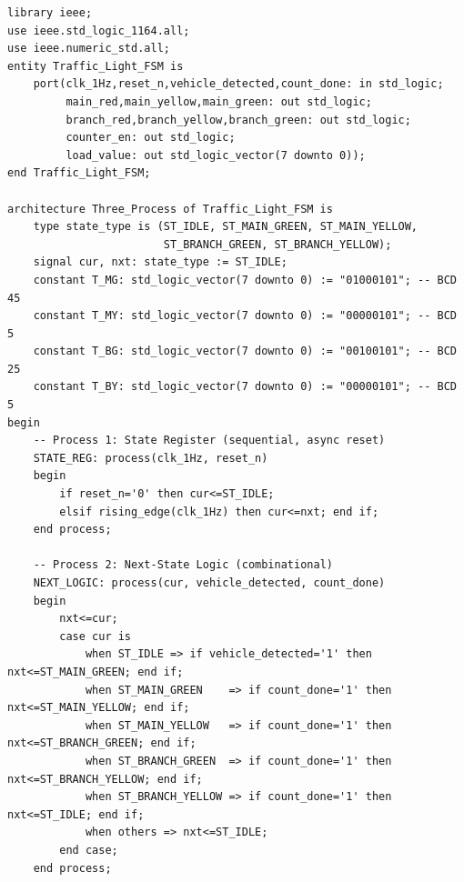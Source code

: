 \documentclass[12pt,a4paper]{ctexart}
\begin{document}
\begin{lstlisting}[caption={Traffic\_Light\_FSM.vhd}]
library ieee;
use ieee.std_logic_1164.all;
use ieee.numeric_std.all;
entity Traffic_Light_FSM is
    port(clk_1Hz,reset_n,vehicle_detected,count_done: in std_logic;
         main_red,main_yellow,main_green: out std_logic;
         branch_red,branch_yellow,branch_green: out std_logic;
         counter_en: out std_logic;
         load_value: out std_logic_vector(7 downto 0));
end Traffic_Light_FSM;

architecture Three_Process of Traffic_Light_FSM is
    type state_type is (ST_IDLE, ST_MAIN_GREEN, ST_MAIN_YELLOW,
                        ST_BRANCH_GREEN, ST_BRANCH_YELLOW);
    signal cur, nxt: state_type := ST_IDLE;
    constant T_MG: std_logic_vector(7 downto 0) := "01000101"; -- BCD 45
    constant T_MY: std_logic_vector(7 downto 0) := "00000101"; -- BCD  5
    constant T_BG: std_logic_vector(7 downto 0) := "00100101"; -- BCD 25
    constant T_BY: std_logic_vector(7 downto 0) := "00000101"; -- BCD  5
begin
    -- Process 1: State Register (sequential, async reset)
    STATE_REG: process(clk_1Hz, reset_n)
    begin
        if reset_n='0' then cur<=ST_IDLE;
        elsif rising_edge(clk_1Hz) then cur<=nxt; end if;
    end process;

    -- Process 2: Next-State Logic (combinational)
    NEXT_LOGIC: process(cur, vehicle_detected, count_done)
    begin
        nxt<=cur;
        case cur is
            when ST_IDLE => if vehicle_detected='1' then nxt<=ST_MAIN_GREEN; end if;
            when ST_MAIN_GREEN    => if count_done='1' then nxt<=ST_MAIN_YELLOW; end if;
            when ST_MAIN_YELLOW   => if count_done='1' then nxt<=ST_BRANCH_GREEN; end if;
            when ST_BRANCH_GREEN  => if count_done='1' then nxt<=ST_BRANCH_YELLOW; end if;
            when ST_BRANCH_YELLOW => if count_done='1' then nxt<=ST_IDLE; end if;
            when others => nxt<=ST_IDLE;
        end case;
    end process;


\end{lstlisting}
\end{document}
